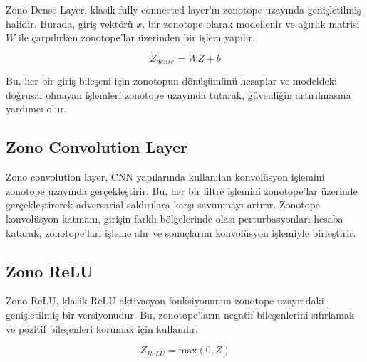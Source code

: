 Zono Dense Layer, klasik fully connected layer'ın zonotope uzayında genişletilmiş halidir. Burada, giriş vektörü $x$, bir zonotope olarak modellenir ve ağırlık matrisi $W$ ile çarpılırken zonotope'lar üzerinden bir işlem yapılır. 

\[ Z_{dense} = W Z + b \]

Bu, her bir giriş bileşeni için zonotopun dönüşümünü hesaplar ve modeldeki doğrusal olmayan işlemleri zonotope uzayında tutarak, güvenliğin artırılmasına yardımcı olur.

\subsection{Zono Convolution Layer}

Zono convolution layer, CNN yapılarında kullanılan konvolüsyon işlemini zonotope uzayında gerçekleştirir. Bu, her bir filtre işlemini zonotope'lar üzerinde gerçekleştirerek adversarial saldırılara karşı savunmayı artırır. Zonotope konvolüsyon katmanı, girişin farklı bölgelerinde olası perturbasyonları hesaba katarak, zonotope'ları işleme alır ve sonuçlarını konvolüsyon işlemiyle birleştirir.

\subsection{Zono ReLU}

Zono ReLU, klasik ReLU aktivasyon fonksiyonunun zonotope uzayındaki genişletilmiş bir versiyonudur. Bu, zonotope'ların negatif bileşenlerini sıfırlamak ve pozitif bileşenleri korumak için kullanılır.

\[ Z_{ReLU} = \text{max}(0, Z) \]

\newpage